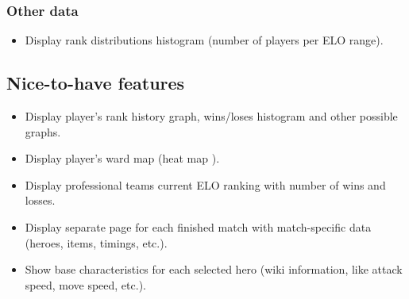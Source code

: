 \subsubsection{Other data}

\begin{itemize}

    \item Display rank distributions histogram (number of players per ELO range).

\end{itemize}


\subsection{Nice-to-have features}

\begin{itemize}

    \item Display player's rank history graph, wins/loses histogram and other possible graphs.
    \item Display player's ward map (heat map ).
    \item Display professional teams current ELO ranking with number of wins and losses.
    \item Display separate page for each finished match with match-specific data (heroes, items, timings, etc.).
    \item Show base characteristics for each selected hero (wiki information, like attack speed, move speed, etc.).

\end{itemize}

